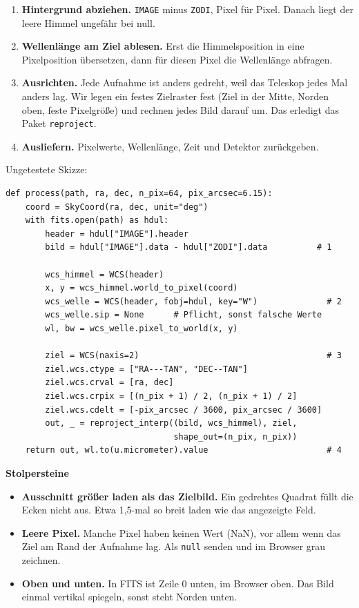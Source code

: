 \documentclass[11pt,a4paper]{article}
\newcommand{\code}[1]{\texttt{#1}}
\begin{document}
\begin{enumerate}
\item \textbf{Hintergrund abziehen.} \code{IMAGE} minus \code{ZODI}, Pixel für Pixel. Danach liegt der leere Himmel ungefähr bei null.
\item \textbf{Wellenlänge am Ziel ablesen.} Erst die Himmelsposition in eine Pixelposition übersetzen, dann für diesen Pixel die Wellenlänge abfragen.
\item \textbf{Ausrichten.} Jede Aufnahme ist anders gedreht, weil das Teleskop jedes Mal anders lag. Wir legen ein festes Zielraster fest (Ziel in der Mitte, Norden oben, feste Pixelgröße) und rechnen jedes Bild darauf um. Das erledigt das Paket \code{reproject}.
\item \textbf{Ausliefern.} Pixelwerte, Wellenlänge, Zeit und Detektor zurückgeben.
\end{enumerate}

Ungetestete Skizze:

\begin{lstlisting}
def process(path, ra, dec, n_pix=64, pix_arcsec=6.15):
    coord = SkyCoord(ra, dec, unit="deg")
    with fits.open(path) as hdul:
        header = hdul["IMAGE"].header
        bild = hdul["IMAGE"].data - hdul["ZODI"].data          # 1

        wcs_himmel = WCS(header)
        x, y = wcs_himmel.world_to_pixel(coord)
        wcs_welle = WCS(header, fobj=hdul, key="W")              # 2
        wcs_welle.sip = None      # Pflicht, sonst falsche Werte
        wl, bw = wcs_welle.pixel_to_world(x, y)

        ziel = WCS(naxis=2)                                      # 3
        ziel.wcs.ctype = ["RA---TAN", "DEC--TAN"]
        ziel.wcs.crval = [ra, dec]
        ziel.wcs.crpix = [(n_pix + 1) / 2, (n_pix + 1) / 2]
        ziel.wcs.cdelt = [-pix_arcsec / 3600, pix_arcsec / 3600]
        out, _ = reproject_interp((bild, wcs_himmel), ziel,
                                  shape_out=(n_pix, n_pix))
    return out, wl.to(u.micrometer).value                        # 4
\end{lstlisting}

\textbf{Stolpersteine}

\begin{itemize}
\item \textbf{Ausschnitt größer laden als das Zielbild.} Ein gedrehtes Quadrat füllt die Ecken nicht aus. Etwa 1,5-mal so breit laden wie das angezeigte Feld.
\item \textbf{Leere Pixel.} Manche Pixel haben keinen Wert (NaN), vor allem wenn das Ziel am Rand der Aufnahme lag. Als \code{null} senden und im Browser grau zeichnen.
\item \textbf{Oben und unten.} In FITS ist Zeile 0 unten, im Browser oben. Das Bild einmal vertikal spiegeln, sonst steht Norden unten.
\end{itemize}
\end{document}
